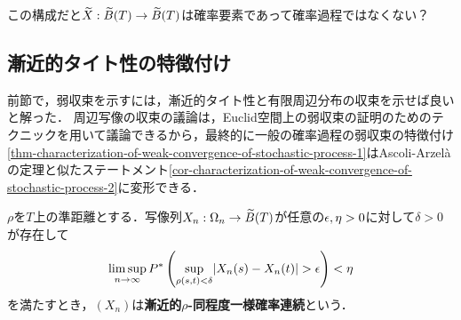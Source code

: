 \documentclass[uplatex,dvipdfmx]{jsreport}
\begin{document}
\begin{remarks}
    この構成だと$\widetilde{X}:\widetilde{B}(T)\to\widetilde{B}(T)$は確率要素であって確率過程ではなくない？
\end{remarks}

\subsection{漸近的タイト性の特徴付け}

\begin{tcolorbox}[colframe=ForestGreen, colback=ForestGreen!10!white,breakable,colbacktitle=ForestGreen!40!white,coltitle=black,fonttitle=\bfseries\sffamily,
title=タイトな可測関数に収束するための十分条件を探るために]
    前節で，弱収束を示すには，漸近的タイト性と有限周辺分布の収束を示せば良いと解った．
    周辺写像の収束の議論は，Euclid空間上の弱収束の証明のためのテクニックを用いて議論できるから，最終的に一般の確率過程の弱収束の特徴付け\ref{thm-characterization-of-weak-convergence-of-stochastic-process-1}はAscoli-Arzelàの定理と似たステートメント\ref{cor-characterization-of-weak-convergence-of-stochastic-process-2}に変形できる．
\end{tcolorbox}

\begin{definition}
    $\rho$を$T$上の準距離とする．写像列$X_n:\Omega_n\to\widetilde{B}(T)$が任意の$\epsilon,\eta>0$に対して$\delta>0$が存在して
    \[\limsup_{n\to\infty} P^*\left(\sup_{\rho(s,t)<\delta}\lvert X_n(s)-X_n(t)\rvert>\epsilon\right)<\eta\]
    を満たすとき，$(X_n)$は\textbf{漸近的$\rho$-同程度一様確率連続}という．
\end{definition}
\end{document}
